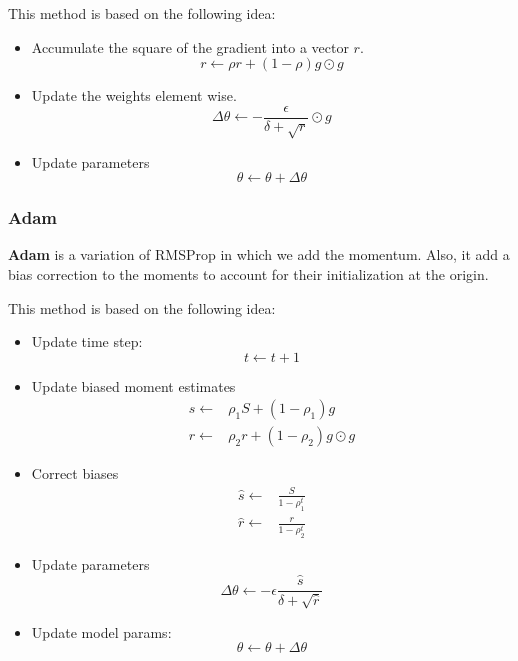 This method is based on the following idea:
\begin{itemize}
    \item Accumulate the square of the gradient into a vector $r$.
          \begin{equation}
              r \gets \rho r + (1 - \rho) g \odot g
          \end{equation}
    \item Update the weights element wise.
          \begin{equation}
              \Delta \theta \gets - \frac{\epsilon}{\delta + \sqrt{r}} \odot g
          \end{equation}
    \item Update parameters
          \begin{equation}
              \theta \gets \theta + \Delta \theta
          \end{equation}
\end{itemize}
\subsubsection{Adam}
\textbf{Adam} is a variation of RMSProp in which we add the momentum. Also, it
add a bias correction to the moments to account for their initialization at the
origin.

This method is based on the following idea:
\begin{itemize}
    \item Update time step:
          \begin{equation}
              t \gets t + 1
          \end{equation}
    \item Update biased moment estimates
          \begin{equation}
              \begin{split}
                  s \gets & \rho_1 S + (1 - \rho_1)g          \\
                  r \gets & \rho_2 r + (1 - \rho_2) g \odot g
              \end{split}
          \end{equation}
    \item Correct biases
          \begin{equation}
              \begin{split}
                  \hat{s} \gets & \frac{S}{1 - \rho_1^t} \\
                  \hat{r} \gets & \frac{r}{1 - \rho_2^t}
              \end{split}
          \end{equation}
    \item Update parameters
          \begin{equation}
              \Delta \theta \gets - \epsilon \frac{\hat{s}}{\delta + \sqrt{\hat{r}}}
          \end{equation}
    \item Update model params:
          \begin{equation}
              \theta \gets \theta + \Delta \theta
          \end{equation}
\end{itemize}